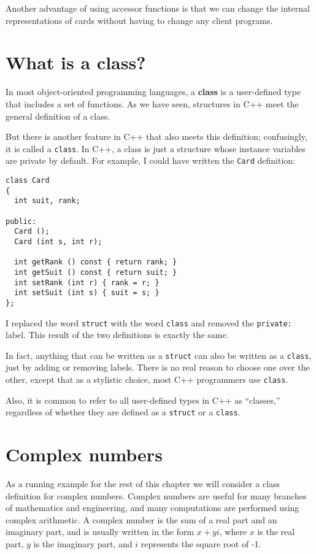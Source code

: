 Another advantage of using accessor functions is that we
can change the internal representations of cards without
having to change any client programs.

\section{What is a class?}

In most object-oriented programming languages, a {\bf class} is
a user-defined type that includes a set of functions.  As
we have seen, structures in C++ meet the general definition of
a class.

But there is another feature in C++ that also meets this definition;
confusingly, it is called a {\tt class}.  In C++, a class
is just a structure whose instance variables are private by
default.  For example, I could have written the {\tt Card}
definition:

\begin{verbatim}
class Card
{
  int suit, rank;

public:
  Card ();
  Card (int s, int r);

  int getRank () const { return rank; }
  int getSuit () const { return suit; }
  int setRank (int r) { rank = r; }
  int setSuit (int s) { suit = s; }
};
\end{verbatim}
%
I replaced the word {\tt struct} with the word {\tt class} and
removed the {\tt private:} label.  This result of the two definitions
is exactly the same.


In fact, anything that can be written as a {\tt struct} can also
be written as a {\tt class}, just by adding or removing labels.
There is no real reason to choose one over the other, except that
as a stylistic choice, most C++ programmers use {\tt class}.

Also, it is common to refer to all user-defined types in C++ as
``classes,'' regardless of whether they are defined as a {\tt struct}
or a {\tt class}.

\section{Complex numbers}

As a running example for the rest of this chapter we will consider a
class definition for complex numbers.  Complex numbers are useful for
many branches of mathematics and engineering, and many computations
are performed using complex arithmetic.  A complex number is the sum
of a real part and an imaginary part, and is usually written in the
form $x + yi$, where $x$ is the real part, $y$ is the imaginary part,
and $i$ represents the square root of -1.

